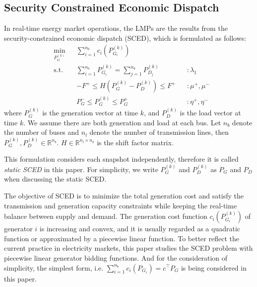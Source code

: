 \documentclass[letterpaper, 11pt]{article}
\theoremstyle{plain}
\theoremstyle{definition}
\begin{document}
\subsection{Security Constrained Economic Dispatch} \label{par:reivew_sced}
In real-time energy market operations, the LMPs are the results from the security-constrained economic dispatch (SCED), which is formulated as follows: 
\begin{subequations}
\label{eqn:ED_primal}
\begin{align}
& \underset{P_G^{(k)}}{\min} && \sum_{i=1}^{n_b} c_i(P_{G_i}^{(k)}) & \label{eqn:static_sced_obj} \\
& \text{s.t.} && \sum_{i = 1}^{n_b}{P_{G_i}^{(k)}} = \sum_{j=1}^{n_b}{P_{D_j}^{(k)}} & & :\lambda_1 \label{eqn:static_sced_balance} \\
& && -F^+ \le H(P_G^{(k)}-P_D^{(k)}) \le F^+ & & :\mu^+, \mu^- \label{eqn:static_sced_transmission}\\
& && P_G^- \le P_G^{(k)} \le P_G^+ & & : \eta^+, \eta^- \label{eqn:static_sced_generation}
\end{align}
\end{subequations}
where $P_G^{(k)}$ is the generation vector at time $k$, and $P_D^{(k)}$ is the load vector at time $k$. We assume there are both generation and load at each bus. Let $n_b$ denote the number of buses and $n_l$ denote the number of transmission lines, then $P_G^{(k)}, P_D^{(k)} \in \mathbb{R}^{n_b}$. 
$H \in \mathbb{R}^{n_l\times n_b} $ is the shift factor matrix.

This formulation considers each snapshot independently, therefore it is called \emph{static SCED} in this paper. For simplicity, we write $P_G^{(k)}$ and $P_D^{(k)}$ as $P_G$ and $P_D$ when discussing the static SCED.




The objective of SCED is to minimize the total generation cost and satisfy the transmission and generation capacity constraints while keeping the real-time balance between supply and demand. The generation cost function $c_i(P_{G_i}^{(k)})$ of generator $i$ is increasing and convex, and it is usually regarded as a  quadratic function or approximated by a piecewise linear function. 
To better reflect the current practice in electricity markets, this paper studies the SCED problem with piecewise linear generator bidding functions. And for the consideration of simplicity, the simplest form, i.e. $\sum_{i=1}^{n_b} c_i(P_{G_i}) = c^\intercal  P_G$ is being considered in this paper. 
\end{document}
